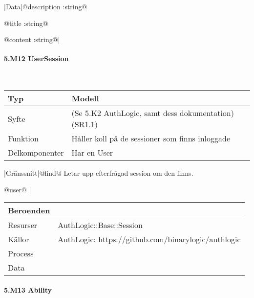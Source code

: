\documentclass[a4paper, twoside, 11pt, titlepage]{article}
\begin{document}
			|Data|@description :string@

			@title :string@

			@content :string@|

			\paragraph{5.M12 UserSession}\

			\begin {table} [ht] \begin{tabular} {  p{3.5cm} p{9.6cm} }
				\hline
				Typ & Modell  \\
				\hline
				Syfte & (Se 5.K2 AuthLogic, samt dess dokumentation) (SR1.1)  \\
				\hline
				Funktion & Håller koll på de sessioner som finns inloggade  \\
				\hline
				Delkomponenter & Har en User  \\
				\hline
			\end{tabular} \end{table} \FloatBarrier
			\vspace{6mm}

			|Gränssnitt|@find@ Letar upp efterfrågad session om den finns.

			@user@ |

			\begin {table} [ht] \begin{tabular} {  p{3.5cm} p{9.6cm} }
				\hline
				Beroenden &   \\
				\hline
				Resurser & AuthLogic::Base::Session  \\
				\hline
				Källor & AuthLogic: https://github.com/binarylogic/authlogic  \\
				\hline
				Process &   \\
				\hline
				Data &   \\
				\hline
			\end{tabular} \end{table} \FloatBarrier


			\paragraph{5.M13 Ability}\
\end{document}
